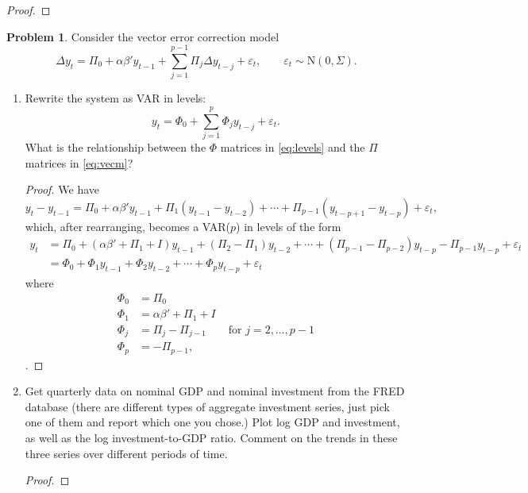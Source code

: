 \documentclass[oneside,reqno]{amsart}
\newcommand{\eps}{\varepsilon}
\newcommand{\N}{\mathrm N}
\theoremstyle{definition}
\newtheorem{prob}{Problem}
\begin{document}
\begin{enumerate}[label=(\roman*)]
\begin{proof}
\end{proof}
\end{enumerate}


\begin{prob}
Consider the vector error correction model
\begin{equation}\label{eq:vecm}
	\Delta y_t = \Pi_0 + \alpha \beta' y_{t-1} + \sum_{j=1}^{p-1} \Pi_j \Delta y_{t-j} + \eps_t, 
	\qquad \eps_t \sim \N(0, \Sigma).
\end{equation}
\end{prob}

\begin{enumerate}[label=(\roman*)]
\item
Rewrite the system as VAR in levels:
\begin{equation}\label{eq:levels}
	y_t = \Phi_0 + \sum_{j=1}^p \Phi_j y_{t-j} + \eps_t.
\end{equation}
What is the relationship between the $\Phi$ matrices in \eqref{eq:levels} and the $\Pi$ matrices in \eqref{eq:vecm}?
\begin{proof}
We have
\[
	y_t - y_{t-1} = \Pi_0 + \alpha \beta' y_{t-1} + \Pi_1 (y_{t-1}  - y_{t-2}) +  \cdots  + \Pi_{p-1} (y_{t-p+1}  - y_{t-p}) + \eps_t,
\]
which, after rearranging, becomes a VAR($p$) in levels of the form
\begin{align*}
	y_t  &= \Pi_0 +  (\alpha \beta' + \Pi_1 + I)y_{t-1}  +(\Pi_2 - \Pi_1) y_{t-2} + \cdots + (\Pi_{p-1} - \Pi_{p-2})  y_{t-p} - \Pi_{p-1}y_{t-p} + \eps_t \\
	&= \Phi_0 +  \Phi_1 y_{t-1}  + \Phi_2 y_{t-2} + \cdots + \Phi_p y_{t-p} + \eps_t
\end{align*}
where 
\begin{align*}
	\Phi_0 &= \Pi_0 \\
	\Phi_1 &=  \alpha \beta' + \Pi_1 + I \\
	\Phi_j &= \Pi_j - \Pi_{j-1} \qquad \text{for } j = 2,\dotsc, p-1 \\
	\Phi_p &= - \Pi_{p-1},
\end{align*} 
.
\end{proof}
\item
Get quarterly data on nominal GDP and nominal investment from the
FRED database (there are different types of aggregate investment series,
just pick one of them and report which one you chose.) Plot log GDP
and investment, as well as the log investment-to-GDP ratio. Comment
on the trends in these three series over different periods of time.
\begin{proof}

\end{proof}
\end{enumerate}
\end{document}
